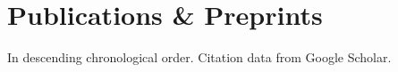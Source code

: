 \documentclass[11pt, a4paper]{awesome-cv}
\begin{document}
%
%
%
%
%

\hypertarget{publications-preprints}{\section{Publications \& Preprints}\label{publications-preprints}}

\footnotesize
In descending chronological order. Citation data from Google Scholar.
\end{document}
